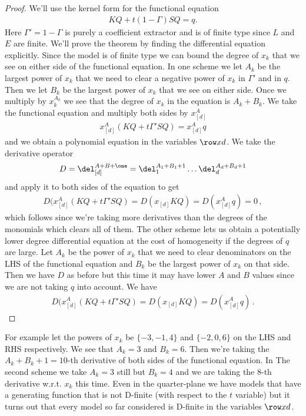 \begin{proof} We'll use the kernel form for the functional equation
\begin{align}
	KQ + t(1- \Gamma)SQ = q.
\end{align}
Here $\Gamma' = 1- \Gamma$ is purely a coefficient extractor and is of finite type since $L$ and $E$ are finite. We'll prove the theorem by finding the differential equation explicitly. Since the model is of finite type we can bound the degree of $x_k$ that we see on either side of the functional equation. In one scheme we let $A_k$ be the largest power of $x_k$ that we need to clear a negative power of $x_k$ in $\Gamma'$ and in $q$. Then we let $B_k$ be the largest power of $x_k$ that we see on either side. Once we multiply by $x_k^{A_k}$ we see that the degree of $x_k$ in the equation is $A_k+B_k$. We take the functional equation and multiply both sides by $x_{[d]}^{A}$
\begin{align}
	x_{[d]}^{A}(KQ + t\Gamma'SQ) = x_{[d]}^{A}q
\end{align}
and we obtain a polynomial equation in the variables $\row xd$. We take the derivative operator
\begin{align}
	D = \del_{[d]}^{A+B+\one} = \del_1^{A_1+B_1+1}\ldots\del_d^{A_d+B_d+1}
\end{align}
and apply it to both sides of the equation to get
\begin{align}
	D(x_{[d]}^{A}(KQ + t\Gamma'SQ)  = D(x_{[d]}KQ) = D(x_{[d]}^{A}q) = 0\,,
\end{align}
which follows since we're taking more derivatives than the degrees of the monomials which clears all of them. The other scheme lets us obtain a potentially lower degree differential equation at the cost of homogeneity if the degrees of $q$ are large. Let $A_k$ be the power of $x_k$ that we need to clear denominators on the LHS of the functional equation and $B_k$ be the largest power of $x_k$ on that side. Then we have $D$ as before but this time it may have lower $A$ and $B$ values since we are not taking $q$ into account. We have
\begin{align}
	D(x_{[d]}^{A}(KQ + t\Gamma'SQ)  = D(x_{[d]}KQ) = D(x_{[d]}^{A}q)\,.
\end{align}
\end{proof}
For example let the powers of $x_k$ be $\{-3,-1,4\}$ and $\{-2,0,6\}$ on the LHS and RHS respectively. We see that $A_k = 3$ and $B_k = 6$. Then we're taking the $A_k + B_k + 1 = 10$-th derivative of both sides of the functional equation. In The second scheme we take $A_k = 3$ still but $B_k = 4$ and we are taking the 8-th derivative w.r.t. $x_k$ this time. Even in the quarter-plane we have models that have a generating function that is not D-finite (with respect to the $t$ variable) but it turns out that every model so far considered is D-finite in the variables $\row xd$.

